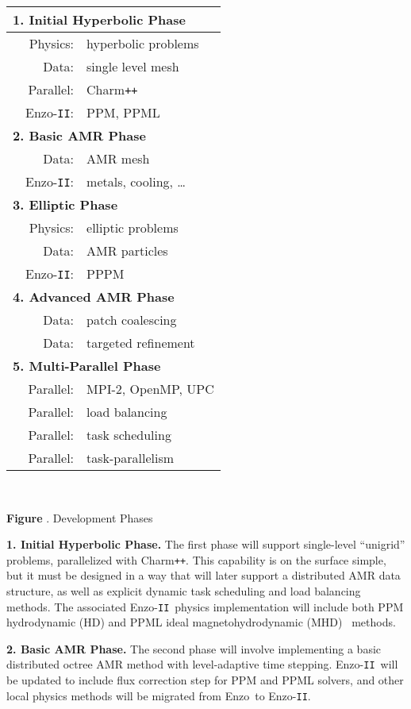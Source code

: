 \documentclass[11pt,letterpaper]{article}
\newcommand{\enzo}{\textsf{Enzo}}
\newcommand{\enzoii}{\textsf{Enzo}-\texttt{II}}
\newcommand{\pp}{\texttt{++}}
\newcommand{\charm}{\textsf{Charm\pp}}
\newcounter{figctr}
\newcommand{\FIGURE}[3]{
\noindent
\parbox{\textwidth}{
\begin{center}
#3
\end{center}%
\ \nolinebreak%
\refstepcounter{figctr}%
\begin{center}%
\begin{minipage}{7.0in}
\textbf{Figure \thefigctr}. #1
\end{minipage}
\end{center}
\label{#2}
}}
\begin{document}
\FIGURE{Development Phases}{t:phases}{
\begin{tabular}{|lrl|} \hline
\multicolumn{3}{|l|}{\textbf{1. Initial Hyperbolic Phase}} \\ \hline
 &  Physics: & hyperbolic problems\\
 &  Data: & single level mesh \\
 &  Parallel: & \charm \\
 &  \enzoii: & PPM, PPML \\ \hline
\multicolumn{3}{|l|}{\textbf{2. Basic AMR Phase}}  \\ \hline
 &  Data: & AMR mesh \\
 &  \enzoii: & metals, cooling, \ldots \\ \hline
\multicolumn{3}{|l|}{\textbf{3. Elliptic Phase}}  \\ \hline
 &  Physics: & elliptic problems \\
 &  Data: & AMR particles \\
 &  \enzoii: & PPPM  \\ \hline
\multicolumn{3}{|l|}{\textbf{4. Advanced AMR Phase}} \\ \hline
 &  Data: & patch coalescing \\
 &  Data: & targeted refinement \\ \hline
\multicolumn{3}{|l|}{\textbf{5. Multi-Parallel Phase}} \\ \hline
 &  Parallel: & MPI-2, OpenMP, UPC \\
 &  Parallel: & load balancing \\
 &  Parallel: & task scheduling \\
 &  Parallel: & task-parallelism \\ \hline
\end{tabular}
}
   

\textbf{1. Initial Hyperbolic Phase.} The first phase will support
single-level ``unigrid'' problems, parallelized with \charm.  This
capability is on the surface simple, but it must be designed in a way
that will later support a distributed AMR data structure, as well as
explicit dynamic task scheduling and load balancing methods.  The
associated \enzoii\ physics implementation will include both PPM
hydrodynamic (HD) and PPML ideal magnetohydrodynamic
(MHD)~\cite{UsPo09} methods.

\textbf{2. Basic AMR Phase.}  The second phase will involve implementing a
basic distributed octree AMR method with level-adaptive time stepping.
\enzoii\ will be updated to include flux correction step for PPM and
PPML solvers, and other local physics methods will be migrated from
\enzo\ to \enzoii.
\end{document}
